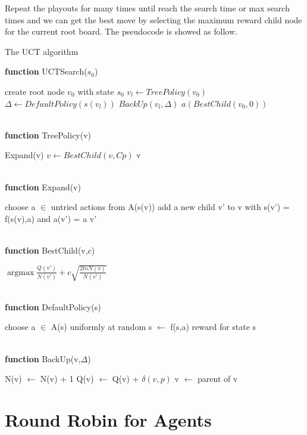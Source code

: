 \documentclass[12pt,a4paper]{article}
\begin{document}
\par Repeat the playouts for many times until reach the search time or max search times and we can get the best move by selecting the maximum reward child node for the current root board. The pseudocode is showed as follow.
\begin{algorithm}[H]
\caption{The UCT algorithm}
\hspace*{0.02in} {\bf function}
UCTSearch($s_0$)
\begin{algorithmic}
\State create root node $v_0$ with state $s_0$
	\State $v_l \gets TreePolicy(v_0)$
	\State $\Delta \gets DefaultPolicy(s(v_l))$
	\State $BackUp(v_l, \Delta)$
\EndWhile
\State \Return $a(BestChild(v_0, 0))$
\end{algorithmic}
~\\
\hspace*{0.02in} {\bf function}
TreePolicy(v)
\begin{algorithmic}
		\State \Return Expand(v)
	\Else
		\State $v \gets BestChild(v, Cp)$
	\EndIf
\EndWhile
\State \Return v
\end{algorithmic}
~\\
\hspace*{0.02in} {\bf function}
Expand(v)
\begin{algorithmic}
\State choose a $\in$ untried actions from A(s(v))
\State add a new child v' to v with s(v') = f(s(v),a) and a(v') = a
\State \Return v'
\end{algorithmic}
~\\
\hspace*{0.02in} {\bf function}
BestChild(v,c)
\begin{algorithmic}
\State \Return $\mathop{\arg\max} \frac{Q(v')}{N(v')} + c\sqrt{\frac{2lnN(v)}{N(v')}}$
\end{algorithmic}
~\\
\hspace*{0.02in} {\bf function}
DefaultPolicy(s)
\begin{algorithmic}
	\State choose a $\in$ A(s) uniformly at random
	\State s $\gets$ f(s,a)
\EndWhile
\State \Return reward for state s
\end{algorithmic}
~\\
\hspace*{0.02in} {\bf function}
BackUp(v,$\Delta$)
\begin{algorithmic}
	\State N(v) $\gets$ N(v) + 1
	\State Q(v) $\gets$ Q(v) + $\delta(v, p)$
	\State v $\gets$ parent of v
\EndWhile
\end{algorithmic}
\end{algorithm}



\section{Round Robin for Agents}




\end{document}
